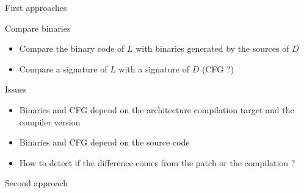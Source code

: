 \documentclass[11pt]{beamer}
\begin{document}
\begin{frame}{First approaches}

\begin{block}{Compare binaries}
	\begin{itemize}
		\item Compare the binary code of $L$ with binaries generated by the sources of $D$
		\item Compare a signature of $L$ with a signature of $D$ (CFG ?)
	\end{itemize}
\end{block}

\begin{block}{Issues}
	\begin{itemize}
		\item Binaries and CFG depend on the architecture compilation target and the compiler version
		\item Binaries and CFG depend on the source code
		\item How to detect if the difference comes from the patch or the compilation ?
	\end{itemize}
\end{block}

\end{frame}



\begin{frame}{Second approach}





\end{frame}
\end{document}
